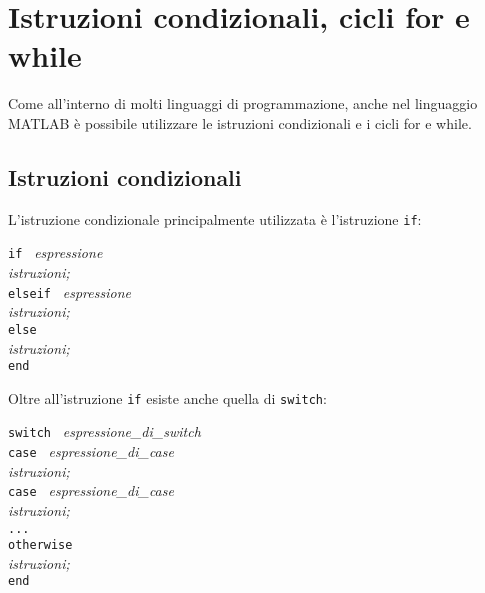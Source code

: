 \chapter{Istruzioni condizionali, cicli for e while}
Come all'interno di molti linguaggi di programmazione, anche nel linguaggio MATLAB è possibile utilizzare le istruzioni 
condizionali e i cicli for e while.

\section{Istruzioni condizionali}
L'istruzione condizionale principalmente utilizzata è l'istruzione \texttt{if}: \break

\begin{center}
\texttt{if } \textit{espressione} \\ 
\hspace{1.5cm}\textit{istruzioni;}  \\
\hspace{1cm}\texttt{elseif } \textit{espressione} \\ 
\hspace{1.4cm}\textit{istruzioni;}  \\
\hspace{-1.8cm}\texttt{else} \\ 
\hspace{1.4cm}\textit{istruzioni;}  \\
\hspace{-2cm}\texttt{end}
\end{center}

Oltre all'istruzione  \texttt{if} esiste anche quella di \texttt{switch}:

\begin{center}
\texttt{switch } \textit{espressione\_di\_switch} \\ 
\hspace{1cm}\texttt{case } \textit{espressione\_di\_case} \\ 
\hspace{1.4cm}\textit{istruzioni;}  \\
\hspace{1cm}\texttt{case } \textit{espressione\_di\_case} \\ 
\hspace{1.4cm}\textit{istruzioni;}  \\
\hspace{2cm} \texttt{...} \\
\hspace{-2cm}\texttt{otherwise } \\ 
\hspace{1.4cm}\textit{istruzioni;}  \\
\hspace{-5cm}\texttt{end}
\end{center}


